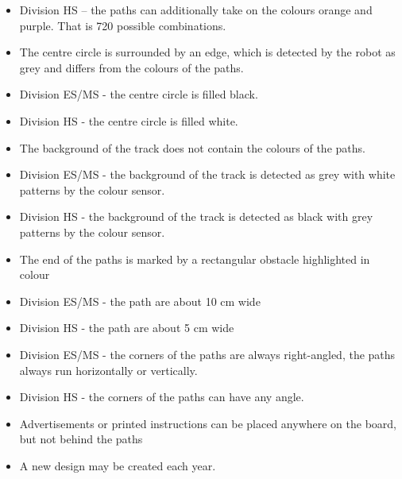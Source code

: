 \documentclass[a4paper,12pt]{article}
\begin{document}
\begin{itemize}
	\item Division HS – the paths can additionally take on the colours
		orange and purple. That is 720 possible combinations.
	\item The centre circle is surrounded by an edge, which is detected by
		the robot as grey and differs from the colours of the paths.
	\item Division ES/MS - the centre circle is filled black.
	\item Division HS - the centre circle is filled white.
	\item The background of the track does not contain the colours of the
		paths.
	\item Division ES/MS - the background of the track is detected as grey
		with white patterns by the colour sensor.
	\item Division HS - the background of the track is detected as black
		with grey patterns by the colour sensor.
	\item The end of the paths is marked by a rectangular obstacle
		highlighted in colour
	\item Division ES/MS - the path are about 10 cm wide
	\item Division HS - the path are about 5 cm wide
	\item Division ES/MS - the corners of the paths are always
		right-angled, the paths always run horizontally or vertically.
	\item Division HS - the corners of the paths can have any angle.
	\item Advertisements or printed instructions can be placed anywhere on
		the board, but not behind the paths
	\item A new design may be created each year.
\end{itemize}
\end{document}
